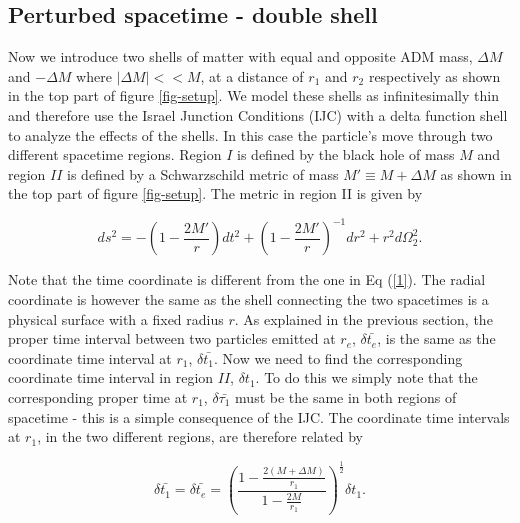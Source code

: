 \documentclass[aps,showpacs,onecolumn,floats,prd,superscriptaddress,nofootinbib]{revtex4-1}
\begin{document}
%
%

\subsection{Perturbed spacetime - double shell}

Now we introduce two shells of matter with equal and opposite ADM mass, $\Delta M$ and $-\Delta M$ where $|\Delta M|<<M$, at a distance of $r_1$ and $r_2$ respectively as shown in the top part of figure \ref{fig-setup}. We model these shells as infinitesimally thin and therefore use the Israel Junction Conditions (IJC) \cite{Isr66} with a delta function shell to analyze the effects of the shells. In this case the particle's move through two different spacetime regions. Region $I$ is defined by the black hole of mass $M$ and region $II$ is defined by a Schwarzschild metric of mass $M' \equiv M+\Delta M$ as shown in the top part of figure \ref{fig-setup}. The metric in region II is given by 

\begin{equation}
	ds^2 = - \left( 1 - \frac{2M'}{r} \right) d t^2 + \left( 1 - \frac{2M'}{r} \right)^{-1} dr^2 + r^2 d \Omega_2^2	\label{2}.
\end{equation}

Note that the time coordinate is different from the one in Eq (\ref{1}). The radial coordinate is however the same as the shell connecting the two spacetimes is a physical surface with a fixed radius $r$. As explained in the previous section, the proper time interval between two particles emitted at $r_e$, $\delta \bar{t_e}$, is the same as the coordinate time interval at $r_1$, $\delta \bar{t_1}$. Now we need to find the corresponding coordinate time interval in region $II$, $\delta t_1$. To do this we simply note that the corresponding proper time at $r_1$, $\delta \bar{\tau_1}$ must be the same in both regions of spacetime - this is a simple consequence of the IJC. The coordinate time intervals at $r_1$, in the two different regions, are therefore related by

\begin{equation}
	\delta \bar{t_1} = \delta \bar{t_e} = \left( \frac{1 - \frac{2(M + \Delta M)}{r_1}}{1 - \frac{2M}{r_1}} \right)^\frac{1}{2} \delta t_1.
\end{equation}
\end{document}
